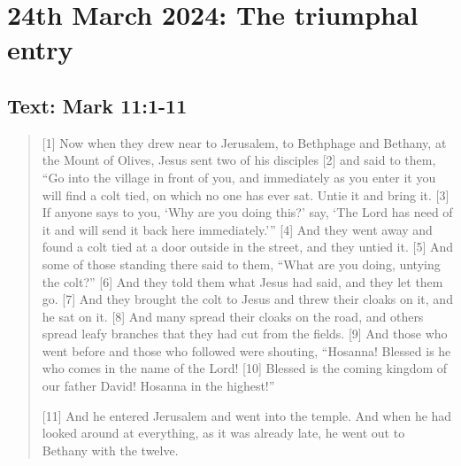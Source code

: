\setcounter{figure}{0}

\section{24th March 2024: The triumphal entry}
\subsection*{Text: Mark 11:1-11}
  \begin{quote}
    [1] Now when they drew near to Jerusalem, to Bethphage and Bethany, at the Mount of Olives, Jesus sent two of his disciples [2] and said to them, “Go into the village in front of you, and immediately as you enter it you will find a colt tied, on which no one has ever sat. Untie it and bring it. [3] If anyone says to you, ‘Why are you doing this?’ say, ‘The Lord has need of it and will send it back here immediately.’” [4] And they went away and found a colt tied at a door outside in the street, and they untied it. [5] And some of those standing there said to them, “What are you doing, untying the colt?” [6] And they told them what Jesus had said, and they let them go. [7] And they brought the colt to Jesus and threw their cloaks on it, and he sat on it. [8] And many spread their cloaks on the road, and others spread leafy branches that they had cut from the fields. [9] And those who went before and those who followed were shouting, “Hosanna! Blessed is he who comes in the name of the Lord! [10] Blessed is the coming kingdom of our father David! Hosanna in the highest!”

    [11] And he entered Jerusalem and went into the temple. And when he had looked around at everything, as it was already late, he went out to Bethany with the twelve.
  \end{quote}
